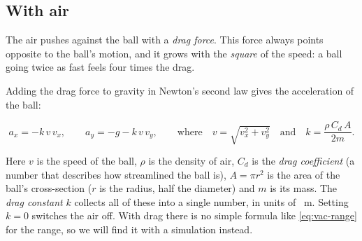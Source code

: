 \documentclass[11pt,a4paper]{article}
\newcounter{task}
\begin{document}
\subsection{With air}
The air pushes against the ball with a \emph{drag force}. This force always points opposite to the ball's motion, and it grows with the \emph{square} of the speed: a ball going twice as fast feels four times the drag.

\begin{center}
\end{center}

Adding the drag force to gravity in Newton's second law gives the acceleration of the ball:

\begin{keyeq}
\vspace{-0.6em}
\begin{equation}
  a_x = -k\, v\, v_x, \qquad
  a_y = -g - k\, v\, v_y, \qquad
  \text{where}\quad v = \sqrt{v_x^2+v_y^2} \quad\text{and}\quad k = \frac{\rho\, C_d\, A}{2m}.
  \label{eq:accel}
\end{equation}
\end{keyeq}

Here $v$ is the speed of the ball, $\rho$ is the density of air, $C_d$ is the \emph{drag coefficient} (a number that describes how streamlined the ball is), $A = \pi r^2$ is the area of the ball's cross-section ($r$ is the radius, half the diameter) and $m$ is its mass. The \emph{drag constant} $k$ collects all of these into a single number, in units of \unit{\per\metre}. Setting $k = 0$ switches the air off. With drag there is no simple formula like \eqref{eq:vac-range} for the range, so we will find it with a simulation instead.
\end{document}
